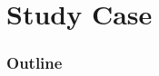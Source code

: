 

 \section{Study Case}

   \begin{frame}
    \frametitle{Outline}
    \begin{columns}[T]
        \begin{column}{.45\textwidth}
            \tableofcontents[sections=1-3,currentsection]
        \end{column}
        \begin{column}{.45\textwidth}
            \tableofcontents[sections=4-5,currentsection]
        \end{column}
    \end{columns}
    \end{frame}

